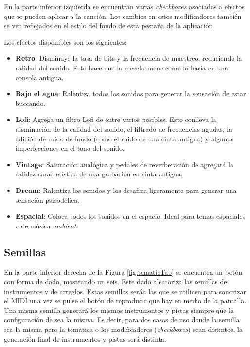 En la parte inferior izquierda se encuentran varias \textit{checkboxes} asociadas a efectos que se pueden aplicar a la canción. Los cambios en estos modificadores también se ven reflejados en el estilo del fondo de esta pestaña de la aplicación.

Los efectos disponibles son los siguientes:

\begin{itemize}
    \item \textbf{Retro}: Disminuye la tasa de bits y la frecuencia de muestreo, reduciendo la calidad del sonido. Esto hace que la mezcla suene como lo haría en una consola antigua.
    \item \textbf{Bajo el agua}: Ralentiza todos los sonidos para generar la sensación de estar buceando.
    \item \textbf{Lofi}: Agrega un filtro Lofi de entre varios posibles. Esto conlleva la disminución de la calidad del sonido, el filtrado de frecuencias agudas, la adición de ruido de fondo (como el ruido de una cinta antigua) y algunas imperfecciones en el tono del sonido.
    \item \textbf{Vintage}: Saturación analógica y pedales de reverberación de agregará la calidez característica de una grabación en cinta antigua.
    \item \textbf{Dream}: Ralentiza los sonidos y los desafina ligeramente para generar una sensación psicodélica.
    \item \textbf{Espacial}: Coloca todos los sonidos en el espacio. Ideal para temas espaciales o de música \textit{ambient}.
\end{itemize}



\subsection{Semillas}
\label{subsec:app:seed}
En la parte inferior derecha de la Figura \ref{fig:tematicTab} se encuentra un botón con forma de dado, mostrando un seis. Este dado aleatoriza las semillas de instrumentos y de arreglos. Estas semillas serán las que se utilicen para sonorizar el MIDI una vez se pulse el botón de reproducir que hay en medio de la pantalla. Una misma semilla generará los mismos instrumentos y pistas siempre que la configuración de  sea la misma. Es decir, para dos casos de uso donde la semilla sea la misma pero la temática o los modificadores (\textit{checkboxes}) sean distintos, la generación final de instrumentos y pistas será distinta.

